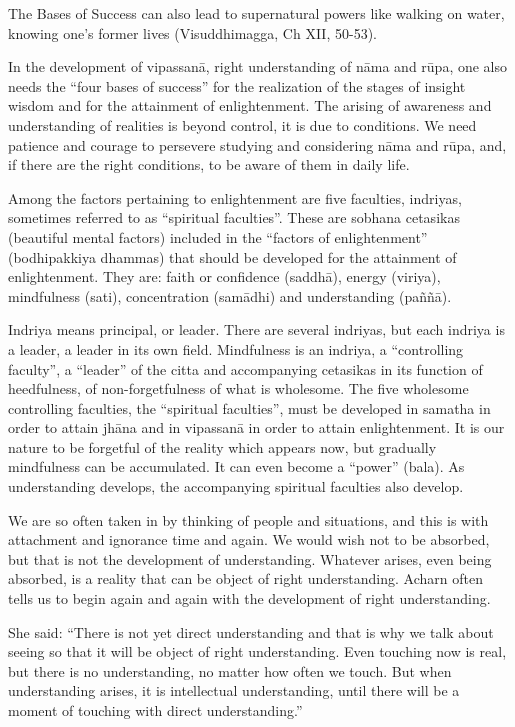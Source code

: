 The Bases of Success can also lead to supernatural powers like walking
on water, knowing one's former lives (Visuddhimagga, Ch XII, 50-53).

In the development of vipassanā, right understanding of nāma and rūpa,
one also needs the ``four bases of success'' for the realization of the
stages of insight wisdom and for the attainment of enlightenment. The
arising of awareness and understanding of realities is beyond control,
it is due to conditions. We need patience and courage to persevere
studying and considering nāma and rūpa, and, if there are the right
conditions, to be aware of them in daily life.

Among the factors pertaining to enlightenment are five faculties,
indriyas, sometimes referred to as ``spiritual faculties''. These are
sobhana cetasikas (beautiful mental factors) included in the ``factors
of enlightenment'' (bodhipakkiya dhammas) that should be developed for
the attainment of enlightenment. They are: faith or confidence (saddhā),
energy (viriya), mindfulness (sati), concentration (samādhi) and
understanding (paññā).

Indriya means principal, or leader. There are several indriyas, but each
indriya is a leader, a leader in its own field. Mindfulness is an
indriya, a ``controlling faculty'', a ``leader'' of the citta and
accompanying cetasikas in its function of heedfulness, of
non-forgetfulness of what is wholesome. The five wholesome controlling
faculties, the ``spiritual faculties'', must be developed in samatha in
order to attain jhāna and in vipassanā in order to attain enlightenment.
It is our nature to be forgetful of the reality which appears now, but
gradually mindfulness can be accumulated. It can even become a ``power''
(bala). As understanding develops, the accompanying spiritual faculties
also develop.

We are so often taken in by thinking of people and situations, and this
is with attachment and ignorance time and again. We would wish not to be
absorbed, but that is not the development of understanding. Whatever
arises, even being absorbed, is a reality that can be object of right
understanding. Acharn often tells us to begin again and again with the
development of right understanding.

She said: ``There is not yet direct understanding and that is why we
talk about seeing so that it will be object of right understanding. Even
touching now is real, but there is no understanding, no matter how often
we touch. But when understanding arises, it is intellectual
understanding, until there will be a moment of touching with direct
understanding.''

